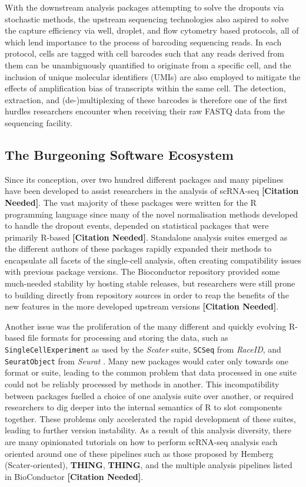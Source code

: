 \documentclass[a4paper,num-refs]{oup-contemporary}
\newcommand{\prog}[1]{\textit{#1}}
\newcommand{\fileformat}[1]{\texttt{#1}}
\newcommand{\citeneed}{{\bf\tiny [Citation Needed]}}
\newcommand{\thing}{{\bf THING}}
\begin{document}
With the downstream analysis packages attempting to solve the dropouts via stochastic methods, the upstream sequencing technologies also aspired to solve the capture efficiency via well, droplet, and flow cytometry based protocols, all of which lend importance to the process of barcoding sequencing reads. In each protocol, cells are tagged with cell barcodes such that any reads derived from them can be unambiguously quantified to originate from a specific cell, and the inclusion of unique molecular identifiers (UMIs) are also employed to mitigate the effects of amplification bias of transcripts within the same cell. The detection, extraction, and (de-)multiplexing of these barcodes is therefore one of the first hurdles researchers encounter when receiving their raw FASTQ data from the sequencing facility.

\subsection{The Burgeoning Software Ecosystem}
Since its conception, over two hundred different packages and many pipelines have been developed to assist researchers in the analysis of scRNA-seq \citeneed. The vast majority of these packages were written for the R programming language since many of the novel normalisation methods developed to handle the dropout events, depended on statistical packages that were primarily R-based \citeneed. Standalone analysis suites emerged as the different authors of these packages rapidly expanded their methods to encapsulate all facets of the single-cell analysis, often creating compatibility issues with previous package versions. The Bioconductor repository provided some much-needed stability by hosting stable releases, but researchers were still prone to building directly from repository sources in order to reap the benefits of the new features in the more developed upstream versions \citeneed.

Another issue was the proliferation of the many different and quickly evolving R-based file formats for processing and storing the data, such as \fileformat{SingleCellExperiment} as used by the \prog{Scater} suite, \fileformat{SCSeq} from \prog{RaceID}, and \fileformat{SeuratObject} from \prog{Seurat} \citep{lun2018singlecellexperiment,mccarthy2017scater,grun2015raceid,satija2015seurat}.
Many new packages would cater only towards one format or suite, leading to the common problem that data processed in one suite could not be reliably processed by methods in another. This incompatibility between packages fuelled a choice of one analysis suite over another, or required researchers to dig deeper into the internal semantics of R to slot components together. These problems only accelerated the rapid development of these suites, leading to further version instability. As a result of this analysis diversity, there are many opinionated tutorials on how to perform scRNA-seq analysis each oriented around one of these pipelines such as those proposed by Hemberg (Scater-oriented), \thing, \thing, and the multiple analysis pipelines listed in BioConductor \citeneed.
\end{document}
